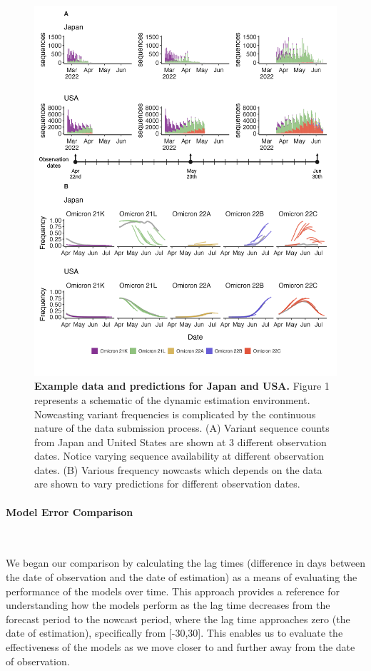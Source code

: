 \documentclass[11pt,oneside,letterpaper]{article}
\begin{document}
\begin{figure}[H]
	\centering
	\includegraphics[width=0.8\textwidth=0.01]{figures/Figure1Final.png}
	\caption{\textbf{Example data and predictions for Japan and USA.}
	Figure 1 represents a schematic of the dynamic estimation environment.
	Nowcasting variant frequencies is complicated by the continuous nature of the data submission process.
	(A) Variant sequence counts from Japan and United States are shown at 3 different observation dates.
	Notice varying sequence availability at different observation dates. 
	(B) Various frequency nowcasts which depends on the data are shown to vary predictions for different observation dates. 
	}
	\label{Example data and predictions for Japan and USA}
\end{figure}





\paragraph{Model Error Comparison}\

We began our comparison by calculating the lag times (difference in days between the date of observation and the date of estimation) as a means of evaluating the performance of the models over time.
This approach provides a reference for understanding how the models perform as the lag time decreases from the forecast period to the nowcast period, where the lag time approaches zero (the date of estimation), specifically from [-30,30].
This enables us to evaluate the effectiveness of the models as we move closer to and further away from the date of observation.
\end{document}
